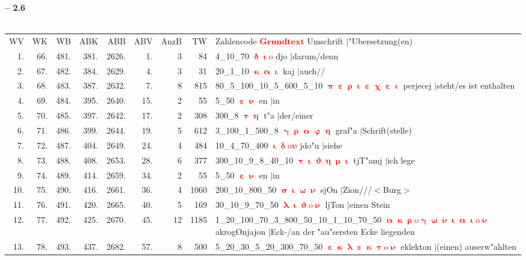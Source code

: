 \documentclass[a4paper,10pt,landscape]{article}
\begin{document}
\newpage 
{\bf -- 2.6}\\
\medskip \\
\begin{tabular}{rrrrrrrrp{120mm}}
WV&WK&WB&ABK&ABB&ABV&AnzB&TW&Zahlencode \textcolor{red}{$\boldsymbol{Grundtext}$} Umschrift $|$"Ubersetzung(en)\\
1.&66.&481.&381.&2626.&1.&3&84&4\_10\_70 \textcolor{red}{$\boldsymbol{\updelta\upiota\mathrm{o}}$} djo $|$darum/denn\\
2.&67.&482.&384.&2629.&4.&3&31&20\_1\_10 \textcolor{red}{$\boldsymbol{\upkappa\upalpha\upiota}$} kaj $|$auch//\\
3.&68.&483.&387.&2632.&7.&8&815&80\_5\_100\_10\_5\_600\_5\_10 \textcolor{red}{$\boldsymbol{\uppi\upepsilon\uprho\upiota\upepsilon\upchi\upepsilon\upiota}$} perjecej $|$steht/es ist enthalten\\
4.&69.&484.&395.&2640.&15.&2&55&5\_50 \textcolor{red}{$\boldsymbol{\upepsilon\upnu}$} en $|$in\\
5.&70.&485.&397.&2642.&17.&2&308&300\_8 \textcolor{red}{$\boldsymbol{\uptau\upeta}$} t"a $|$der/einer\\
6.&71.&486.&399.&2644.&19.&5&612&3\_100\_1\_500\_8 \textcolor{red}{$\boldsymbol{\upgamma\uprho\upalpha\upvarphi\upeta}$} graf"a $|$Schrift(stelle)\\
7.&72.&487.&404.&2649.&24.&4&484&10\_4\_70\_400 \textcolor{red}{$\boldsymbol{\upiota\updelta\mathrm{o}\upsilon}$} jdo"u $|$siehe\\
8.&73.&488.&408.&2653.&28.&6&377&300\_10\_9\_8\_40\_10 \textcolor{red}{$\boldsymbol{\uptau\upiota\upvartheta\upeta\upmu\upiota}$} tjT"amj $|$ich lege\\
9.&74.&489.&414.&2659.&34.&2&55&5\_50 \textcolor{red}{$\boldsymbol{\upepsilon\upnu}$} en $|$in\\
10.&75.&490.&416.&2661.&36.&4&1060&200\_10\_800\_50 \textcolor{red}{$\boldsymbol{\upsigma\upiota\upomega\upnu}$} sjOn $|$Zion///$<$Burg$>$\\
11.&76.&491.&420.&2665.&40.&5&169&30\_10\_9\_70\_50 \textcolor{red}{$\boldsymbol{\uplambda\upiota\upvartheta\mathrm{o}\upnu}$} ljTon $|$einen Stein\\
12.&77.&492.&425.&2670.&45.&12&1185&1\_20\_100\_70\_3\_800\_50\_10\_1\_10\_70\_50 \textcolor{red}{$\boldsymbol{\upalpha\upkappa\uprho\mathrm{o}\upgamma\upomega\upnu\upiota\upalpha\upiota\mathrm{o}\upnu}$} akrogOnjajon $|$Eck-/an der "au"sersten Ecke liegenden\\
13.&78.&493.&437.&2682.&57.&8&500&5\_20\_30\_5\_20\_300\_70\_50 \textcolor{red}{$\boldsymbol{\upepsilon\upkappa\uplambda\upepsilon\upkappa\uptau\mathrm{o}\upnu}$} eklekton $|$(einen) auserw"ahlten\\

\end{tabular}
\end{document}
